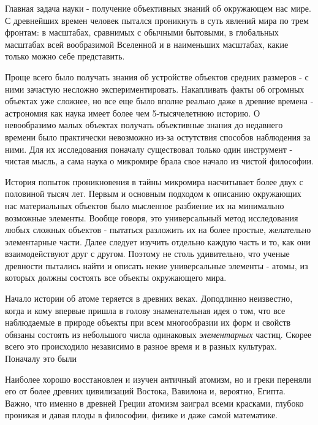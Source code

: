 Главная задача науки - получение объективных знаний об окружающем нас мире.
С древнейших времен человек пытался проникнуть в суть явлений мира по трем фронтам: в масштабах, сравнимых с обычными бытовыми, в глобальных масштабах всей вообразимой Вселенной и в наименьших масштабах, какие только можно себе представить.

Проще всего было получать знания об устройстве объектов средних размеров - с ними зачастую несложно экспериментировать.
Накапливать факты об огромных объектах уже сложнее, но все еще было вполне реально даже в древние времена - астрономия как наука имеет более чем 5-тысячелетнюю историю. 
О невообразимо малых объектах получать объективные знания до недавнего времени было практически невозможно из-за остутствия способов наблюдения за ними.
Для их исследования поначалу существовал только один инструмент - чистая мысль, а сама наука о микромире брала свое начало из чистой философии.

История попыток проникновения в тайны микромира насчитывает более двух с половиной тысяч лет.
Первым и основным подходом к описанию окружающих нас материальных объектов было мысленное разбиение их на минимально возможные элементы.
Вообще говоря, это универсальный метод исследования любых сложных объектов - пытаться разложить их на более простые, желательно элементарные части. 
Далее следует изучить отдельно каждую часть и то, как они взаимодействуют друг с другом.
Поэтому не столь удивительно, что ученые древности пытались найти и описать некие универсальные элементы - атомы, из которых должны состоять все объекты окружающего мира.

Начало истории об атоме теряется в древних веках.
Доподлинно неизвестно, когда и кому впервые пришла в голову знаменательная идея о том, что все наблюдаемые в природе объекты при всем многообразии их форм и свойств обязаны состоять из небольшого числа одинаковых \textit{элементарных} частиц.
Скорее всего это происходило независимо в разное время и в разных культурах.
Поначалу это были 


Наиболее хорошо восстановлен и изучен античный атомизм, но и греки переняли его от более древних цивилизаций Востока, Вавилона и, вероятно, Египта.
Важно, что именно в древней Греции атомизм заиграл всеми красками, глубоко проникая и давая плоды в философии, физике и даже самой математике.


